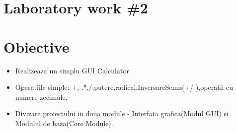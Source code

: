 \section*{Laboratory work \#2}


\section{Obiective}

\begin{itemize}
\item Realizeaza un simplu GUI Calculator
\item Operatiile simple: +,-,*,/,putere,radical,InversareSemn(+/-),operatii cu numere zecimale.
\item Divizare proiectului in doua module - Interfata grafica(Modul GUI) si Modulul de baza(Core Module).
\end{itemize}

\clearpage
